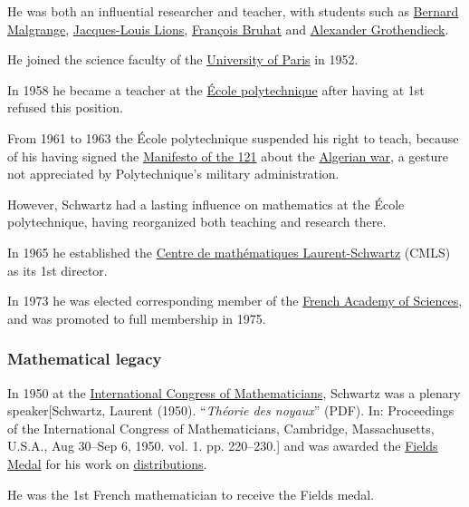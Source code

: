 \documentclass{article}
\begin{document}
He was both an influential researcher and teacher, with students such as \href{https://en.wikipedia.org/wiki/Bernard_Malgrange}{Bernard Malgrange}, \href{https://en.wikipedia.org/wiki/Jacques-Louis_Lions}{Jacques-Louis Lions}, \href{https://en.wikipedia.org/wiki/Fran%C3%A7ois_Bruhat}{François Bruhat} and \href{https://en.wikipedia.org/wiki/Alexander_Grothendieck}{Alexander Grothendieck}.

He joined the science faculty of the \href{https://en.wikipedia.org/wiki/University_of_Paris}{University of Paris} in 1952.

In 1958 he became a teacher at the \href{https://en.wikipedia.org/wiki/%C3%89cole_polytechnique}{École polytechnique} after having at 1st refused this position.

From 1961 to 1963 the École polytechnique suspended his right to teach, because of his having signed the \href{https://en.wikipedia.org/wiki/Manifesto_of_the_121}{Manifesto of the 121} about the \href{https://en.wikipedia.org/wiki/Algerian_war}{Algerian war}, a gesture not appreciated by Polytechnique's military administration.

However, Schwartz had a lasting influence on mathematics at the École polytechnique, having reorganized both teaching and research there.

In 1965 he established the \href{https://en.wikipedia.org/wiki/Centre_de_math%C3%A9matiques_Laurent-Schwartz}{Centre de mathématiques Laurent-Schwartz} (CMLS) as its 1st director.

%
In 1973 he was elected corresponding member of the \href{https://en.wikipedia.org/wiki/French_Academy_of_Sciences}{French Academy of Sciences}, and was promoted to full membership in 1975.

\subsubsection{Mathematical legacy}
In 1950 at the \href{https://en.wikipedia.org/wiki/International_Congress_of_Mathematicians}{International Congress of Mathematicians}, Schwartz was a plenary speaker[Schwartz, Laurent (1950). ``\textit{Théorie des noyaux}'' (PDF). In: Proceedings of the International Congress of Mathematicians, Cambridge, Massachusetts, U.S.A., Aug 30--Sep 6, 1950. vol. 1. pp. 220--230.] and was awarded the \href{https://en.wikipedia.org/wiki/Fields_Medal}{Fields Medal} for his work on \href{https://en.wikipedia.org/wiki/Distribution_(mathematics)}{distributions}.

He was the 1st French mathematician to receive the Fields medal.
\end{document}
